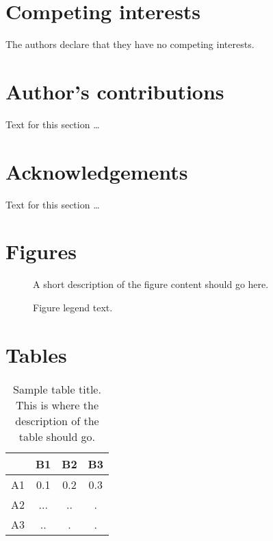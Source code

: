 \documentclass{bmcart}
\begin{document}
\begin{backmatter}

\section*{Competing interests}
  The authors declare that they have no competing interests.

\section*{Author's contributions}
    Text for this section \ldots

\section*{Acknowledgements}
  Text for this section \ldots


       







\section*{Figures}
  \begin{figure}[h!]
  \caption{
      A short description of the figure content
      should go here.}
      \end{figure}

\begin{figure}[h!]
  \caption{
      Figure legend text.}
      \end{figure}



\section*{Tables}
\begin{table}[h!]
\caption{Sample table title. This is where the description of the table should go.}
      \begin{tabular}{cccc}
        \hline
           & B1  &B2   & B3\\ \hline
        A1 & 0.1 & 0.2 & 0.3\\
        A2 & ... & ..  & .\\
        A3 & ..  & .   & .\\ \hline
      \end{tabular}
\end{table}




\end{backmatter}
\end{document}
